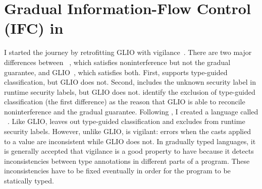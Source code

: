 \chapter{Gradual Information-Flow Control (IFC) in \Surface}
\label{ch:examples}

{\color{NavyBlue} %

I started the journey by retrofitting GLIO with
vigilance~\parencite{Gierczak:2024ab}. There are two major differences between
\GSLRef~\parencite{Toro:2018aa}, which satisfies noninterference but not the
gradual guarantee, and GLIO~\parencite{Amorim:2020aa}, which satisfies both.
First, \GSLRef supports type-guided classification, but GLIO does not. Second,
\GSLRef includes the unknown security label \unk in runtime security labels, but
GLIO does not. \textcite{Amorim:2020aa} identify the exclusion of type-guided
classification (the first difference) as the reason that GLIO is able to
reconcile noninterference and the gradual guarantee. Following
\textcite{Amorim:2020aa}, I created a language called
\SurfaceOld~\parencite{Chen:2022aa}. Like GLIO, \SurfaceOld leaves out
type-guided classification and excludes \unk from runtime security labels.
However, unlike GLIO, \SurfaceOld is vigilant: \SurfaceOld errors when the casts
applied to a value are inconsistent while GLIO does not. In gradually typed
languages, it is generally accepted that vigilance is a good property to have
because it detects inconsistencies between type annotations in different parts
of a program. These inconsistencies have to be fixed eventually in order for the
program to be statically typed.

}
